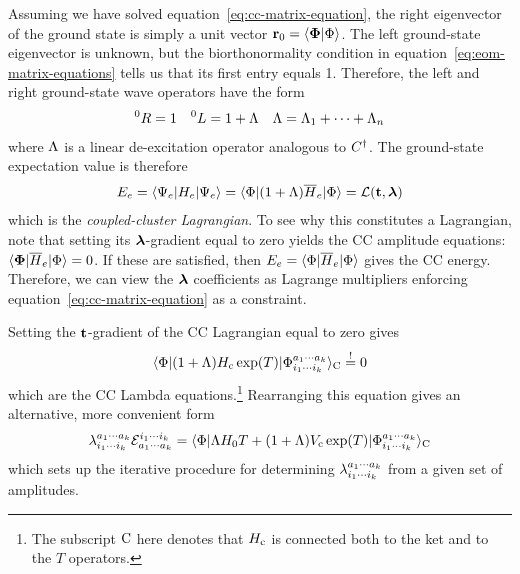 \documentclass[11pt]{article}
\numberwithin{equation}{section}
\begin{document}
\begin{dfn}
Assuming we have solved equation~\ref{eq:cc-matrix-equation}, the right eigenvector of the ground state is simply a unit vector
$
  \mathbf{r}_0
=
  \langle\mathbf{\Phi }|\Phi \rangle
$.
The left ground-state eigenvector is unknown, but the biorthonormality condition in equation~\ref{eq:eom-matrix-equations} tells us that its first entry equals 1.
Therefore, the left and right ground-state wave operators have the form
\begin{align}
\label{eq:cc-ground-state-wave-operators}
  {}^0R
=
  1
&&
  {}^0L
=
  1
+
  \Lambda 
&&
  \Lambda 
=
  \Lambda _1
+
  \cdots
+
  \Lambda _n
\end{align}
where $\Lambda $ is a linear de-excitation operator analogous to $C^\dagger$.
The ground-state expectation value is therefore
\begin{align}
  E_e
=
  \ip{\Y_e|H_e|\Y_e}
=
  \ip{\F|
    (
      1
    +
      \La
    )
    \ol{H}_e
  |\F}
=
  \mc{L}(\bo{t},\bm{\la})
\end{align}
which is the \textit{coupled-cluster Lagrangian}.
To see why this constitutes a Lagrangian, note that setting its $\bm{\la}$-gradient equal to zero yields the CC amplitude equations: $\langle\mathbf{\Phi }|\overline{H}_e|\Phi \rangle=0$.
If these are satisfied, then
$
  E_e
=
  \langle\Phi |\overline{H}_e|\Phi \rangle
$
gives the CC energy.
Therefore, we can view the $\bm{\la}$ coefficients as Lagrange multipliers enforcing equation~\ref{eq:cc-matrix-equation} as a constraint.
\end{dfn}


\begin{dfn}
Setting the $\mathbf{t}$-gradient of the CC Lagrangian equal to zero gives
\begin{align}
  \langle\Phi |
  (
    1
  +
    \Lambda 
  )
  H_{\mathrm{c}}\,
  \mathrm{exp}(T)
  |\Phi _{i_1\cdots i_k}^{a_1\cdots a_k}\rangle_{\mathrm{C}}
\overset{!}{=}
  0
\end{align}
which are the CC Lambda equations.\footnote{
The subscript $\mathrm{C}$ here denotes that $H_{\mathrm{c}}$ is connected both to the ket and to the $T$ operators.
}
Rearranging this equation gives an alternative, more convenient form
\begin{align}
  \lambda _{i_1\cdots i_k}^{a_1\cdots a_k}
  \mathcal{E}_{a_1\cdots a_k}^{i_1\cdots i_k}
=
  \langle\Phi |
  \Lambda 
  H_0
  T
  +
  (
    1
  +
    \Lambda 
  )
  V_{\mathrm{c}}\,
  \mathrm{exp}(T)
  |\Phi _{i_1\cdots i_k}^{a_1\cdots a_k}\rangle_{\mathrm{C}}
\end{align}
which sets up the iterative procedure for determining $\lambda _{i_1\cdots i_k}^{a_1\cdots a_k}$ from a given set of amplitudes.
\end{dfn}
\end{document}
